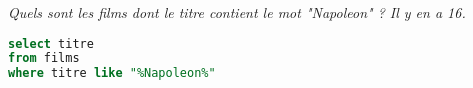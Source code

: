 \begin{Exercise} \it Quels sont les films dont le titre contient le mot "Napoleon"  ? Il y en a 16.
\end{Exercise}
\begin{Answer}
\begin{lstlisting}[language=SQL]
select titre
from films 
where titre like "%Napoleon%" 
\end{lstlisting}
\end{Answer}
